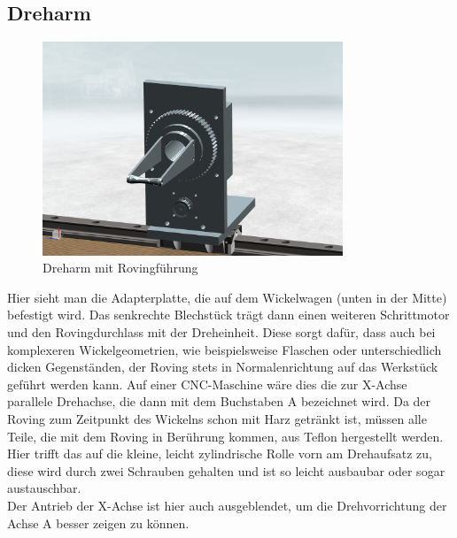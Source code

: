 \documentclass[paper=A4,pagesize,DIV=18, 12pt,listof=totoc,bibliography=totoc,headings=optiontohead,open=any]{article}
\begin{document}
\subsection{Dreharm}
\begin{figure}[H]
	\centering
	\includegraphics[width=0.8\textwidth]{NX_Screenshots/arm_vorne.png}
	\caption{Dreharm mit Rovingführung} 
	\label{fig:dreharm}
\end{figure}
Hier sieht man die Adapterplatte, die auf dem Wickelwagen (unten in der Mitte) befestigt wird. Das senkrechte Blechstück trägt dann einen weiteren Schrittmotor und den Rovingdurchlass mit der Dreheinheit. Diese sorgt dafür, dass auch bei komplexeren Wickelgeometrien, wie beispielsweise Flaschen oder unterschiedlich dicken Gegenständen, der Roving stets in Normalenrichtung auf das Werkstück geführt werden kann. Auf einer CNC-Maschine wäre dies die zur X-Achse parallele Drehachse, die dann mit dem Buchstaben A bezeichnet wird. Da der Roving zum Zeitpunkt des Wickelns schon mit Harz getränkt ist, müssen alle Teile, die mit dem Roving in Berührung kommen, aus Teflon hergestellt werden. Hier trifft das auf die kleine, leicht zylindrische Rolle vorn am Drehaufsatz zu, diese wird durch zwei Schrauben gehalten und ist so leicht ausbaubar oder sogar austauschbar.\\
Der Antrieb der X-Achse ist hier auch ausgeblendet, um die Drehvorrichtung der Achse A besser zeigen zu können.
\end{document}
